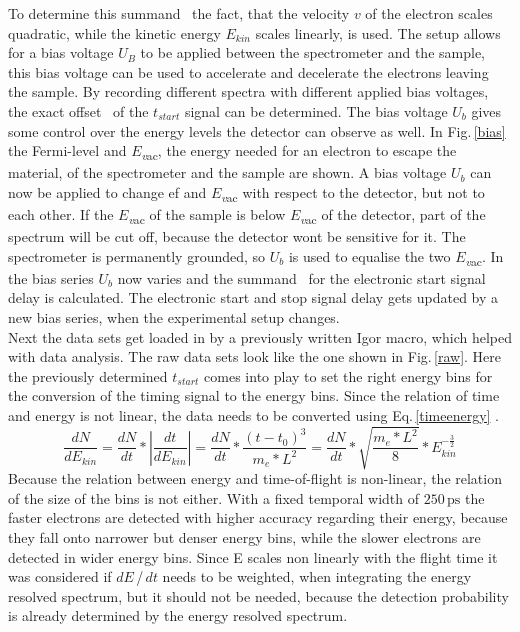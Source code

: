 \documentclass[a4paper,12pt,twoside]{article}
\begin{document}
To determine this summand \textalpha\, the fact, that the velocity $v$ of the electron scales quadratic, while the kinetic energy $E_{kin}$ scales linearly, is used. The setup allows for a bias voltage $U_B$ to be applied between the spectrometer and the sample, this bias voltage can be used to accelerate and decelerate the electrons leaving the sample. By recording different spectra with different applied bias voltages, the exact offset \textalpha\, of the $t_{start}$ signal can be determined. The bias voltage $U_{b}$ gives some control over the energy levels the detector can observe as well. In Fig.\,\ref{bias} the Fermi-level and $E$\textsubscript{\textit vac}, the energy needed for an electron to escape the material, of the spectrometer and the sample are shown. A bias voltage $U_{b}$ can now be applied to change \gls{ef} and $E$\textsubscript{\textit vac} with respect to the detector, but not to each other. If the $E$\textsubscript{\textit vac} of the sample is below $E$\textsubscript{\textit vac} of the detector, part of the spectrum will be cut off, because the detector wont be sensitive for it. The spectrometer is permanently grounded, so $U_{b}$ is used to equalise the two $E$\textsubscript{\textit vac}. In the bias series $U_{b}$ now varies and the summand \textalpha\, for the electronic start signal delay is calculated. The electronic start and stop signal delay gets updated by a new bias series, when the experimental setup changes.
\\
Next the data sets get loaded in by a previously written Igor macro, which helped with data analysis. The raw data sets look like the one shown in Fig.\,\ref{raw}. Here the previously determined $t_{start}$ comes into play to set the right energy bins for the conversion of the timing signal to the energy bins. Since the relation of time and energy is not linear, the data needs to be converted using Eq.\,\ref{timeenergy} \cite{Lisowski}.
    \begin{equation}
        \label{timeenergy}
        \frac{ dN }{ dE_{ kin } } = \frac{ dN }{ dt  }*\left\lvert \frac{ dt }{ dE_{ kin } }\right\rvert = \frac{ dN }{ dt  }* \frac{ \left( t - t_{0} \right)^{3} }{ m_{e} * L^{2} } = \frac{ dN }{ dt  } * \sqrt{ \frac{m_{e} * L^{2}}{ 8 }} * E_{kin}^{-\frac{ 3 }{ 2 }}
	\end{equation}
Because the relation between energy and time-of-flight is non-linear, the relation of the size of the bins is not either. With a fixed temporal width of $250\,\mathrm{ps}$ the faster electrons are detected with higher accuracy regarding their energy, because they fall onto narrower but denser energy bins, while the slower electrons are detected in wider energy bins. Since \textDelta E scales non linearly with the flight time it was considered if $dE$\,/\,$dt$ needs to be weighted, when integrating the energy resolved spectrum, but it should not be needed, because the detection probability is already determined by the energy resolved spectrum.
\end{document}
